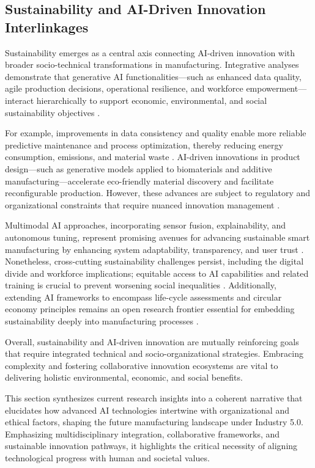 \documentclass[sigconf]{acmart}
\begin{document}
\subsection{Sustainability and AI-Driven Innovation Interlinkages}

Sustainability emerges as a central axis connecting AI-driven innovation with broader socio-technical transformations in manufacturing. Integrative analyses demonstrate that generative AI functionalities—such as enhanced data quality, agile production decisions, operational resilience, and workforce empowerment—interact hierarchically to support economic, environmental, and social sustainability objectives \cite{ref5}.

For example, improvements in data consistency and quality enable more reliable predictive maintenance and process optimization, thereby reducing energy consumption, emissions, and material waste \cite{ref11,ref36}. AI-driven innovations in product design—such as generative models applied to biomaterials and additive manufacturing—accelerate eco-friendly material discovery and facilitate reconfigurable production. However, these advances are subject to regulatory and organizational constraints that require nuanced innovation management \cite{ref14,ref21}.

Multimodal AI approaches, incorporating sensor fusion, explainability, and autonomous tuning, represent promising avenues for advancing sustainable smart manufacturing by enhancing system adaptability, transparency, and user trust \cite{ref5,ref30}. Nonetheless, cross-cutting sustainability challenges persist, including the digital divide and workforce implications; equitable access to AI capabilities and related training is crucial to prevent worsening social inequalities \cite{ref5}. Additionally, extending AI frameworks to encompass life-cycle assessments and circular economy principles remains an open research frontier essential for embedding sustainability deeply into manufacturing processes \cite{ref38}.

Overall, sustainability and AI-driven innovation are mutually reinforcing goals that require integrated technical and socio-organizational strategies. Embracing complexity and fostering collaborative innovation ecosystems are vital to delivering holistic environmental, economic, and social benefits.

This section synthesizes current research insights into a coherent narrative that elucidates how advanced AI technologies intertwine with organizational and ethical factors, shaping the future manufacturing landscape under Industry 5.0. Emphasizing multidisciplinary integration, collaborative frameworks, and sustainable innovation pathways, it highlights the critical necessity of aligning technological progress with human and societal values.
\end{document}

